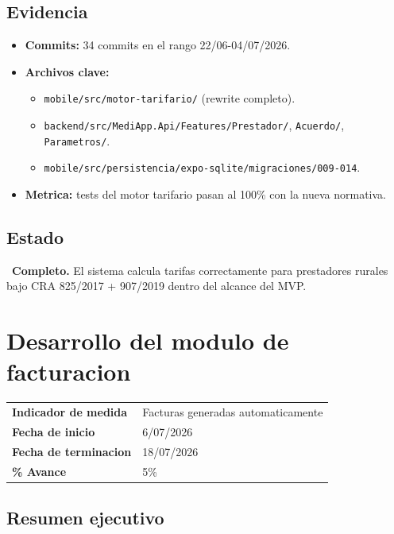 \documentclass[11pt,a4paper,oneside]{report}
\begin{document}
\section{Evidencia}

\begin{itemize}[leftmargin=*]
    \item \textbf{Commits:} 34 commits en el rango 22/06-04/07/2026.
    \item \textbf{Archivos clave:}
    \begin{itemize}
        \item \texttt{mobile/src/motor-tarifario/} (rewrite completo).
        \item \texttt{backend/src/MediApp.Api/Features/Prestador/}, \texttt{Acuerdo/}, \texttt{Parametros/}.
        \item \texttt{mobile/src/persistencia/expo-sqlite/migraciones/009-014}.
    \end{itemize}
    \item \textbf{Metrica:} tests del motor tarifario pasan al 100\% con la nueva normativa.
\end{itemize}

\section{Estado}

\checkmark\ \textbf{Completo.} El sistema calcula tarifas correctamente para prestadores rurales bajo CRA 825/2017 + 907/2019 dentro del alcance del MVP.


\chapter{Desarrollo del modulo de facturacion}

\begin{tabularx}{\textwidth}{L{4cm} X}
\toprule
\textbf{Indicador de medida} & Facturas generadas automaticamente \\
\textbf{Fecha de inicio} & 6/07/2026 \\
\textbf{Fecha de terminacion} & 18/07/2026 \\
\textbf{\% Avance} & 5\% \\
\bottomrule
\end{tabularx}

\section{Resumen ejecutivo}
\end{document}
